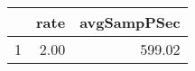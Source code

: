 \begin{table}[h]
\centering
\begin{tabular}{rrr}
  \hline
 & rate & avgSampPSec \\ 
  \hline
1 & 2.00 & 599.02 \\ 
   \hline
\end{tabular}
\end{table}
